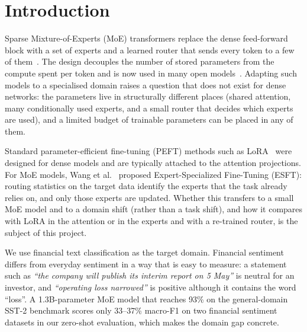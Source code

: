 \section{Introduction}

Sparse Mixture-of-Experts (MoE) transformers replace the dense feed-forward block with a set
of experts and a learned router that sends every token to a few of them~\cite{shazeer2017moe,fedus2022switch}.
The design decouples the number of stored parameters from the compute spent per token and is
now used in many open models~\cite{jiang2024mixtral,dai2024deepseekmoe,muennighoff2024olmoe,granite2024}.
Adapting such models to a specialised domain raises a question that does not exist for dense
networks: the parameters live in structurally different places (shared attention, many
conditionally used experts, and a small router that decides which experts are used), and a
limited budget of trainable parameters can be placed in any of them.

Standard parameter-efficient fine-tuning (PEFT) methods such as LoRA~\cite{hu2022lora} were
designed for dense models and are typically attached to the attention projections. For MoE
models, Wang et al.~\cite{wang2024esft} proposed Expert-Specialized Fine-Tuning (ESFT): routing
statistics on the target data identify the experts that the task already relies on, and only
those experts are updated. Whether this transfers to a small MoE model and to a domain shift
(rather than a task shift), and how it compares with LoRA in the attention or in the experts
and with a re-trained router, is the subject of this project.

We use financial text classification as the target domain. Financial sentiment differs from
everyday sentiment in a way that is easy to measure: a statement such as \emph{``the company
will publish its interim report on 5 May''} is neutral for an investor, and \emph{``operating
loss narrowed''} is positive although it contains the word ``loss''. A 1.3B-parameter MoE model
that reaches 93\% on the general-domain SST-2 benchmark scores only 33--37\% macro-F1 on two
financial sentiment datasets in our zero-shot evaluation, which makes the domain gap concrete.

